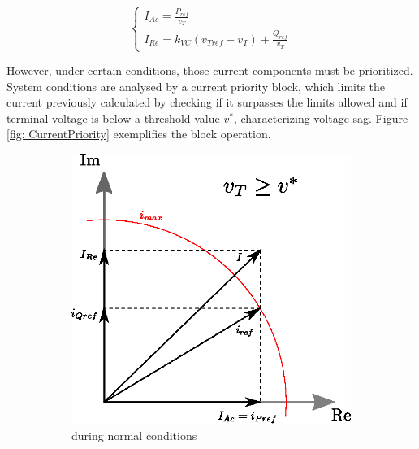 \begin{equation}
	\begin{cases}
		I_{Ac} = \frac{P_{ref}}{v_{T}} \\
		I_{Re} = k_{VC}(v_{Tref} - v_{T}) + \frac{Q_{ref}}{v_{T}}
	\end{cases}
	\label{eq: Currents}
\end{equation}

However, under certain conditions, those current components must be prioritized. System conditions are analysed by a current priority block, which limits the current previously calculated by checking if it surpasses the limits allowed and if terminal voltage is below a threshold value $v^{*}$, characterizing voltage sag. Figure \ref{fig: CurrentPriority} exemplifies the block operation.

\begin{figure}[b]
	\caption{Current priority operation}
	\centering
	\begin{subfigure}[b]{0.4\textwidth}
		\centering
        \includegraphics[width=\textwidth]{Images/priority_block1.eps}
        \caption{during normal conditions}
        \label{fig: priority_normal}
	\end{subfigure}
    \begin{subfigure}[b]{0.4\textwidth}
		\centering

\end{subfigure}
\end{figure}
